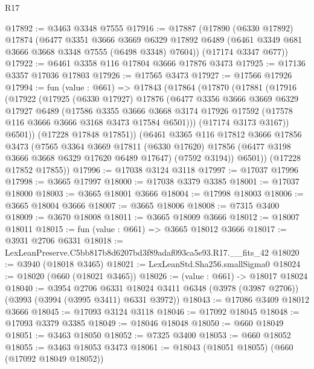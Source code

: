 \begin{lexlean}{R17}
\begin{coremodule}
@17892 := @3463 @3348 @7555
@17916 := @17887
    (@17890
      (@6330 @17892)
      @17874
      (@6477
        @3351
        @3666
        @3669
        @6329
        @17892
        @6489
        (@6461 @3349 @681 @3666 @3668 @3348 @7555 (@6498 @3348) @7604))
      (@17174 @3347 @677))
@17922 := @6461 @3358 @116 @17804 @3666 @17876 @3473
@17925 := @17136 @3357 @17036 @17803
@17926 := @17565 @3473
@17927 := @17566 @17926
@17994 := fun (value : @661) =>
  @17843
    (@17864
      (@17870
        (@17881
          (@17916
            (@17922
              (@17925
                (@6330 @17927)
                @17876
                (@6477
                  @3356
                  @3666
                  @3669
                  @6329
                  @17927
                  @6489
                  (@17586
                    @3355
                    @3666
                    @3668
                    @3174
                    @17926
                    @17592
                    (@17578 @116 @3666 @3666 @3168 @3473 @17584 @6501)))
                (@17174 @3173 @3167))
              @6501))
          (@17228 @17848 @17851))
        (@6461
          @3365
          @116
          @17812
          @3666
          @17856
          @3473
          (@7565
            @3364
            @3669
            @17811
            (@6330 @17620)
            @17856
            (@6477 @3198 @3666 @3668 @6329 @17620 @6489 @17647)
            (@7592 @3194))
          @6501))
      (@17228 @17852 @17855))
@17996 := @17038 @3124 @3118
@17997 := @17037 @17996
@17998 := @3665 @17997
@18000 := @17038 @3379 @3385
@18001 := @17037 @18000
@18003 := @3665 @18001 @3666
@18004 := @17998 @18003
@18006 := @3665 @18004 @3666
@18007 := @3665 @18006
@18008 := @7315 @3400
@18009 := @3670 @18008
@18011 := @3665 @18009 @3666
@18012 := @18007 @18011
@18015 := fun (value : @661) => @3665 @18012 @3666
@18017 := @3931 @2706 @6331
@18018 := LexLeanPreserve.C5bb817b8d6207bd3f89adaf093ca5e93.R17.__fits_42
@18020 := @3940 (@18018 @3465)
@18021 := LexLeanStd.Sha256.smallSigma0
@18024 := @18020 (@660 (@18021 @3465))
@18026 := (value : @661) -> @18017 @18024
@18040 := @3954
    @2706
    @6331
    @18024
    @3411
    @6348
    (@3978 (@3987 @2706))
    (@3993 (@3994 (@3995 @3411) @6331 @3972))
@18043 := @17086 @3409 @18012 @3666
@18045 := @17093 @3124 @3118
@18046 := @17092 @18045
@18048 := @17093 @3379 @3385
@18049 := @18046 @18048
@18050 := @660 @18049
@18051 := @3463 @18050
@18052 := @7325 @3400
@18053 := @660 @18052
@18055 := @3463 @18053 @3473
@18061 := @18043 (@18051 @18055) (@660 (@17092 @18049 @18052))

\end{coremodule}
\end{lexlean}
